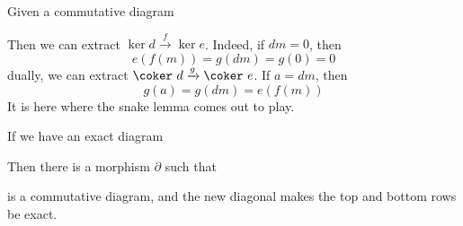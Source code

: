 Given a commutative diagram
%
\begin{center}
\end{center}
%
Then we can extract $\ker d \xrightarrow{f} \ker e$. Indeed, if $dm = 0$, then
%
\[ e(f(m)) = g(dm) = g(0) = 0 \]
%
dually, we can extract $\coker\ d \xrightarrow{g} \coker\ e$. If $a = dm$, then
%
\[ g(a) = g(dm) = e(f(m)) \]
%
It is here where the snake lemma comes out to play.

\begin{theorem}
    If we have an exact diagram
    \begin{center}
    \end{center}
    Then there is a morphism $\partial$ such that
    \begin{center}
    \end{center}
    is a commutative diagram, and the new diagonal makes the top and bottom rows be exact.
\end{theorem}

